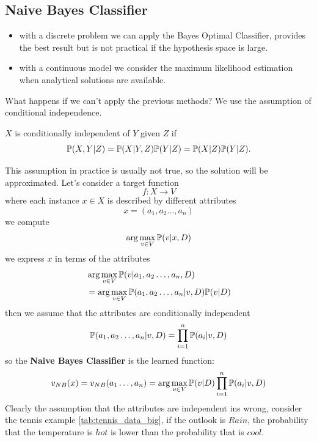 \documentclass[10pt, letterpaper]{report}
\begin{document}
\subsection{Naive Bayes Classifier}
\begin{itemize}
    \item with a discrete problem we can apply the Bayes Optimal Classifier, provides the best result but is not practical if the hypothesis space is large.
    \item with a continuous model we consider the maximum likelihood estimation when analytical solutions are available.
\end{itemize}
What happens if we can't apply the previous methods? We use the assumption of conditional independence.\begin{definition}
    $X$ is conditionally independent of $Y$ given $Z$ if\begin{equation}
        {\mathbb P}(X, Y|Z)= {\mathbb P}(X|Y,Z){\mathbb P}(Y|Z)={\mathbb P}(X|Z){\mathbb P}(Y|Z).
    \end{equation}
\end{definition}
This assumption in practice is usually not true, so the solution will be approximated.
Let's consider a target function $$f:X\rightarrow V $$ where each instance $x\in X$ is described by different attributes $$x=(a_1,a_2\dots, a_n)$$
we compute\begin{equation}
    \arg\max_{v\in V}{\mathbb P}(v|x,D)
\end{equation}
we express $x$ in terms of the attributes\begin{align}
    &\arg\max_{v\in V}{\mathbb P}(v|a_1,a_2\dots, a_n,D)\\
    &=\arg\max_{v\in V}{\mathbb P}(a_1,a_2\dots, a_n|v,D){\mathbb P}(v|D)
\end{align}
then we assume that the attributes are conditionally independent\begin{equation}
    {\mathbb P}(a_1,a_2\dots, a_n|v,D)=\prod_{i=1}^{n} {\mathbb P}(a_i|v,D)
\end{equation}
so the \textbf{Naive Bayes Classifier} is the learned function:\begin{equation}
    v_{NB}(x)=v_{NB}(a_1\dots, a_n)=\arg\max_{v\in V}{\mathbb P}(v|D)\prod_{i=1}^{n} {\mathbb P}(a_i|v,D)
\end{equation}
Clearly the assumption that the attributes are independent ins wrong, consider the tennis example \ref{tab:tennis_data_big}, if the outlook is $Rain$, the probability that the temperature is $hot$ is lower than the probability that is $cool$.\bigskip
\end{document}
